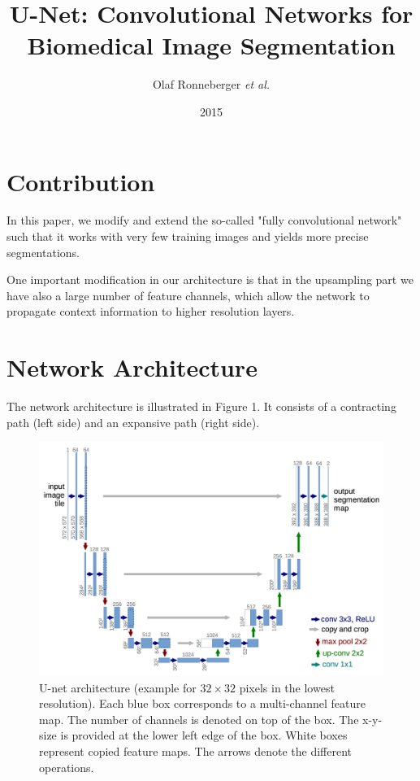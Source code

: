 \documentclass[a4paper,12pt]{article}
\title{U-Net: Convolutional Networks for Biomedical Image Segmentation}
\author{Olaf Ronneberger \emph{et al.}}
\date{2015}
\begin{document}
\maketitle

\section{Contribution}

In this paper, we modify and extend the so-called "fully convolutional network" such that it works with very few training images and yields more precise segmentations.

One important modification in our architecture is that in the upsampling part we have also a large number of feature channels, which allow the network to propagate context information to higher resolution layers.

\section{Network Architecture}

The network architecture is illustrated in Figure 1. It consists of a contracting path (left side) and an expansive path (right side).

\begin{figure}[ht]
	\includegraphics[width=\columnwidth]{img/u-net.jpg}
	\caption{U-net architecture (example for $32 \times 32$ pixels in the lowest resolution). Each blue box corresponds to a multi-channel feature map. The number of channels is denoted on top of the box. The x-y-size is provided at the lower left edge of the box. White boxes represent copied feature maps. The arrows denote the different operations.}
\end{figure}
\end{document}

